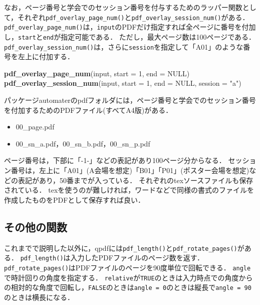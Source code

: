 \documentclass[
]{article}
\newenvironment{Shaded}{\begin{snugshade}}{\end{snugshade}}
\newcommand{\AttributeTok}[1]{\textcolor[rgb]{0.13,0.29,0.53}{#1}}
\newcommand{\ConstantTok}[1]{\textcolor[rgb]{0.56,0.35,0.01}{#1}}
\newcommand{\DecValTok}[1]{\textcolor[rgb]{0.00,0.00,0.81}{#1}}
\newcommand{\FunctionTok}[1]{\textcolor[rgb]{0.13,0.29,0.53}{\textbf{#1}}}
\newcommand{\NormalTok}[1]{#1}
\newcommand{\StringTok}[1]{\textcolor[rgb]{0.31,0.60,0.02}{#1}}
\providecommand{\tightlist}{%
  \setlength{\itemsep}{0pt}\setlength{\parskip}{0pt}}
\begin{document}
なお，ページ番号と学会でのセッション番号を付与するためのラッパー関数として，それぞれ\texttt{pdf\_overlay\_page\_num()}と\texttt{pdf\_overlay\_session\_num()}がある．
\texttt{pdf\_overlay\_page\_num()}は，\texttt{input}のPDFだけ指定すれば全ページに番号を付加し，\texttt{start}と\texttt{end}が指定可能である．
ただし，最大ページ数は100ページである．
\texttt{pdf\_overlay\_session\_num()}は，さらに\texttt{session}を指定して「A01」のような番号を左上に付加する．

\begin{Shaded}
\begin{Highlighting}[]
\FunctionTok{pdf\_overlay\_page\_num}\NormalTok{(input, }\AttributeTok{start =} \DecValTok{1}\NormalTok{, }\AttributeTok{end =} \ConstantTok{NULL}\NormalTok{)}
\FunctionTok{pdf\_overlay\_session\_num}\NormalTok{(input, }\AttributeTok{start =} \DecValTok{1}\NormalTok{, }\AttributeTok{end =} \ConstantTok{NULL}\NormalTok{, }\AttributeTok{session =} \StringTok{"a"}\NormalTok{)}
\end{Highlighting}
\end{Shaded}

パッケージautomaterのpdfフォルダには，ページ番号と学会でのセッション番号を付加するためのPDFファイル(すべてA4版)がある．

\begin{itemize}
\tightlist
\item
  00\_page.pdf\\
\item
  00\_sn\_a.pdf，00\_sn\_b.pdf，00\_sn\_p.pdf
\end{itemize}

ページ番号は，下部に「-1-」などの表記があり100ページ分からなる．
セッション番号は，左上に「A01」(A会場を想定)「B01」「P01」(ポスター会場を想定)などの表記があり，50番までが入っている．
それぞれのtexソースファイルも保存されている．
texを使うのが難しければ，ワードなどで同様の書式のファイルを作成したものをPDFとして保存すれば良い．

\hypertarget{ux305dux306eux4ed6ux306eux95a2ux6570-1}{%
\subsection{その他の関数}\label{ux305dux306eux4ed6ux306eux95a2ux6570-1}}

これまでで説明した以外に，qpdfには\texttt{pdf\_length()}と\texttt{pdf\_rotate\_pages()}がある．
\texttt{pdf\_length()}は入力したPDFファイルのページ数を返す．
\texttt{pdf\_rotate\_pages()}はPDFファイルのページを90度単位で回転できる．
\texttt{angle}で時計回りの角度を指定する．
\texttt{relative}が\texttt{TRUE}のときは入力時点での角度からの相対的な角度で回転し，\texttt{FALSE}のときは\texttt{angle\ =\ 0}のときは縦長で\texttt{angle\ =\ 90}のときは横長になる．
\end{document}
